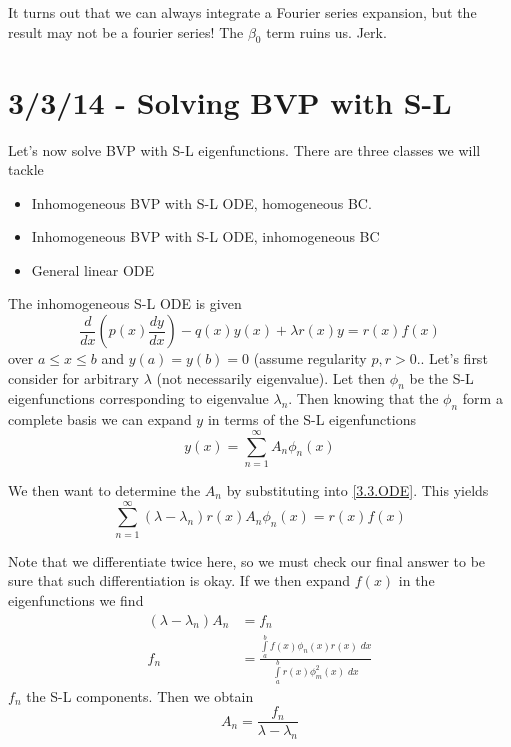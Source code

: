 \documentclass[10pt]{report}
\newcommand{\rd}[2]{\frac{d#1}{d#2}}
\begin{document}
It turns out that we can always integrate a Fourier series expansion, but the result may not be a fourier series! The $\beta_0$ term ruins us. Jerk.
\chapter{3/3/14 - Solving BVP with S-L}

Let's now solve BVP with S-L eigenfunctions. There are three classes we will tackle
\begin{itemize}
    \item Inhomogeneous BVP with S-L ODE, homogeneous BC.
    \item Inhomogeneous BVP with S-L ODE, inhomogeneous BC
    \item General linear ODE
\end{itemize}

The inhomogeneous S-L ODE is given
\begin{equation}
    \rd{}{x}\left( p(x)\rd{y}{x} \right) - q(x)y(x) + \lambda r(x)y = r(x) f(x)\label{3.3.ODE}
\end{equation}
over $a \leq x \leq b$ and $y(a) = y(b) = 0$ (assume regularity $p, r > 0$.. Let's first consider for arbitrary $\lambda$ (not necessarily eigenvalue). Let then $\phi_n$ be the S-L eigenfunctions corresponding to eigenvalue $\lambda_n$. Then knowing that the $\phi_n$ form a complete basis we can expand $y$ in terms of the S-L eigenfunctions
\begin{equation}
    y(x) = \sum_{n=1}^{\infty}A_n\phi_n(x)
\end{equation}

We then want to determine the $A_n$ by substituting into \eqref{3.3.ODE}. This yields
\begin{equation}
    \sum_{n=1}^{\infty} (\lambda - \lambda_n)r(x)A_n\phi_n(x) = r(x)f(x)
\end{equation}

Note that we differentiate twice here, so we must check our final answer to be sure that such differentiation is okay. If we then expand $f(x)$ in the eigenfunctions we find
\begin{align}
    (\lambda - \lambda_n)A_n &= f_n\\
    f_n &= \frac{\displaystyle\int\limits_{a}^{b}f(x)\phi_n(x)r(x)\;dx}{\displaystyle\int\limits_{a}^{b}r(x)\phi_m^2(x)\;dx}
\end{align}
$f_n$ the S-L components. Then we obtain
\begin{equation}
    A_n = \frac{f_n}{\lambda - \lambda_n}
\end{equation}
\end{document}
